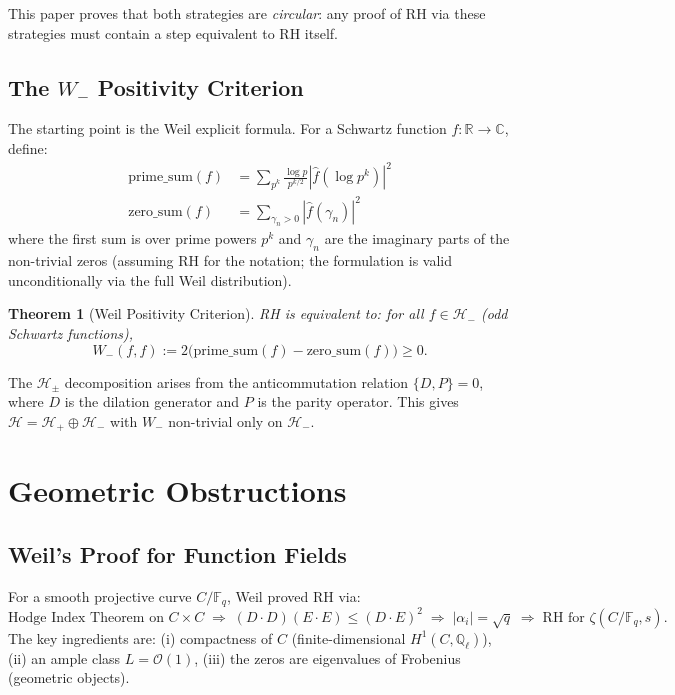 \documentclass[12pt]{article}
\newtheorem{theorem}{Theorem}[section]
\newcommand{\RR}{\mathbb{R}}
\newcommand{\CC}{\mathbb{C}}
\newcommand{\Hplus}{\mathcal{H}_+}
\newcommand{\Hminus}{\mathcal{H}_-}
\begin{document}
This paper proves that both strategies are \emph{circular}: any proof of RH
via these strategies must contain a step equivalent to RH itself.

\subsection{The $W_-$ Positivity Criterion}

The starting point is the Weil explicit formula. For a Schwartz function
$f: \RR \to \CC$, define:
\begin{align}
\text{prime\_sum}(f) &= \sum_{p^k} \frac{\log p}{p^{k/2}} |\hat{f}(\log p^k)|^2 \\
\text{zero\_sum}(f) &= \sum_{\gamma_n > 0} |\hat{f}(\gamma_n)|^2
\end{align}
where the first sum is over prime powers $p^k$ and $\gamma_n$ are the
imaginary parts of the non-trivial zeros (assuming RH for the notation;
the formulation is valid unconditionally via the full Weil distribution).

\begin{theorem}[Weil Positivity Criterion]
RH is equivalent to: for all $f \in \mathcal{H}_-$ (odd Schwartz functions),
\[
W_-(f,f) := 2\bigl(\text{prime\_sum}(f) - \text{zero\_sum}(f)\bigr) \geq 0.
\]
\end{theorem}

The $\mathcal{H}_\pm$ decomposition arises from the anticommutation relation
$\{D, P\} = 0$, where $D$ is the dilation generator and $P$ is the parity
operator. This gives $\mathcal{H} = \Hplus \oplus \Hminus$ with $W_-$
non-trivial only on $\Hminus$.

\section{Geometric Obstructions}

\subsection{Weil's Proof for Function Fields}

For a smooth projective curve $C/\mathbb{F}_q$, Weil proved RH via:
\[
\text{Hodge Index Theorem on } C \times C
\;\Longrightarrow\;
(D \cdot D)(E \cdot E) \leq (D \cdot E)^2
\;\Longrightarrow\;
|\alpha_i| = \sqrt{q}
\;\Longrightarrow\;
\text{RH for } \zeta(C/\mathbb{F}_q, s).
\]
The key ingredients are: (i) compactness of $C$ (finite-dimensional
$H^1(C, \mathbb{Q}_\ell)$), (ii) an ample class $L = \mathcal{O}(1)$,
(iii) the zeros are eigenvalues of Frobenius (geometric objects).
\end{document}
